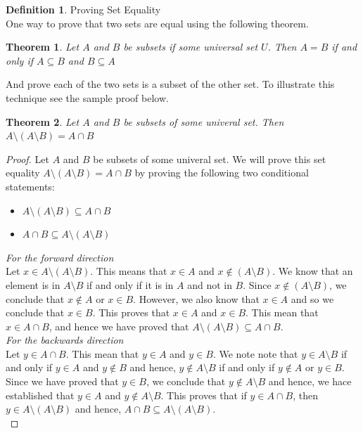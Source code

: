 \documentclass{book}
\newtheorem{theorem}{Theorem}[section]
\theoremstyle{definition}
\newtheorem{definition}{Definition}[section]
\theoremstyle{remark}
\begin{document}
\newpage 
\begin{definition}
Proving Set Equality \\

    One way to prove that two sets are equal using the following theorem. 
        \begin{theorem}
            Let $A$ and $B$ be subsets if some universal set $U$. Then $A = B$ if and only if $A \subseteq B$ and $B \subseteq A$
        \end{theorem}
    And prove each of the two sets is a subset of the other set. To illustrate this technique see the sample proof below. 
    
        \begin{tcolorbox}
            \begin{theorem}
                Let $A$ and $B$ be subsets of some univeral set. Then $A \setminus (A \setminus B) = A \cap B$
            \end{theorem}
        \end{tcolorbox}
        
        \begin{proof}
            Let $A$ and $B$ be subsets of some univeral set. We will prove this set equality $A \setminus (A \setminus B) = A \cap B$ by proving the following two conditional statements:
                \begin{itemize}
                    \item $A \setminus (A \setminus B) \subseteq A \cap B$
                    \item $A \cap B \subseteq A \setminus (A \setminus B)$
                \end{itemize}
            
            \textit{For the forward direction} \\ 
                Let $x \in A \setminus (A \setminus B) $. This means that $x \in A$ and $x \notin (A \setminus B)$. We know that an element is in $A \setminus B$ if and only if it is in $A$ and not in $B$. Since $x \notin (A \setminus B)$, we conclude that $x \notin A$ or $x \in B$. However, we also know that $x \in A$ and so we conclude that $x \in B$. This proves that $x \in A$ and $x \in B$. This mean that $x \in A \cap B$, and hence we have proved that $A \setminus (A \setminus B) \subseteq A \cap B$. \\
            
            \textit{For the backwards direction} \\
                Let $y \in A \cap B$. This mean that $y \in A$ and $y \in B$. We note note that $y \in A \setminus B$ if and only if $y \in A$ and $y \notin B$ and hence, $y \notin A \setminus B$ if and only if $y \notin A$ or $y \in B$. Since we have proved that $y \in B$, we conclude that $y \notin A \setminus B$ and hence, we hace established that $y \in A$ and $y \notin A \setminus B$. This proves that if $y \in A \cap B$, then $y \in A \setminus (A \setminus B)$ and hence, $A \cap B \subseteq A \setminus (A \setminus B)$. \\
            

\end{proof}
\end{definition}
\end{document}
